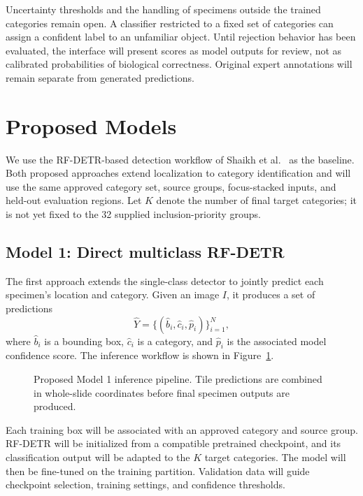 \documentclass[11pt,letterpaper]{article}
\begin{document}
Uncertainty thresholds and the handling of specimens outside the trained categories remain open. A classifier restricted to a fixed set of categories can assign a confident label to an unfamiliar object. Until rejection behavior has been evaluated, the interface will present scores as model outputs for review, not as calibrated probabilities of biological correctness. Original expert annotations will remain separate from generated predictions.

\section{Proposed Models}
We use the RF-DETR-based detection workflow of Shaikh et al.\ \citep{shaikh2026} as the baseline. Both proposed approaches extend localization to category identification and will use the same approved category set, source groups, focus-stacked inputs, and held-out evaluation regions. Let $K$ denote the number of final target categories; it is not yet fixed to the 32 supplied inclusion-priority groups.

\subsection{Model 1: Direct multiclass RF-DETR}
The first approach extends the single-class detector to jointly predict each specimen's location and category. Given an image $I$, it produces a set of predictions
\[
\widehat{Y}=\{(\widehat{b}_i,\widehat{c}_i,\widehat{p}_i)\}_{i=1}^{N},
\]
where $\widehat{b}_i$ is a bounding box, $\widehat{c}_i$ is a category, and $\widehat{p}_i$ is the associated model confidence score. The inference workflow is shown in Figure~\ref{fig:model1}.

\begin{figure}[htbp]
\centering
{}
\caption{Proposed Model 1 inference pipeline. Tile predictions are combined in whole-slide coordinates before final specimen outputs are produced.}
\label{fig:model1}
\end{figure}

Each training box will be associated with an approved category and source group. RF-DETR will be initialized from a compatible pretrained checkpoint, and its classification output will be adapted to the $K$ target categories. The model will then be fine-tuned on the training partition. Validation data will guide checkpoint selection, training settings, and confidence thresholds.
\end{document}
